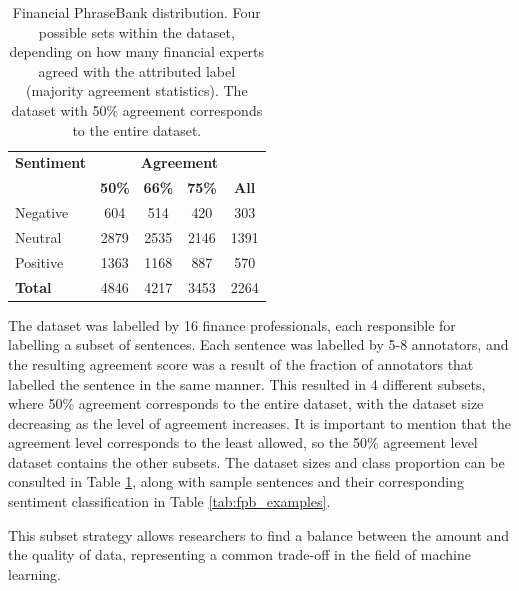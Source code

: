 \documentclass[conference]{IEEEtran}
\begin{document}
\begin{table}[H]
\centering
\caption{Financial PhraseBank distribution. Four possible sets within the dataset, depending on how many financial experts agreed with the attributed label (majority agreement statistics). The dataset with 50\% agreement corresponds to the entire dataset.}

\label{agreement_datasets}
\begin{tabular}{lcccc}
\toprule
\textbf{Sentiment} & \multicolumn{4}{c}{\textbf{Agreement}} \\
\cmidrule(lr){2-5}
 & \textbf{50\%} & \textbf{66\%} & \textbf{75\%} & \textbf{All} \\
\midrule
Negative & 604 & 514 & 420 & 303 \\
Neutral & 2879 & 2535 & 2146 & 1391 \\
Positive & 1363 & 1168 & 887 & 570 \\
\midrule
\textbf{Total} & 4846 & 4217 & 3453 & 2264 \\
\bottomrule
\end{tabular}
\end{table}

The dataset was labelled by 16 finance professionals, each responsible for labelling a subset of sentences. Each sentence was labelled by 5-8 annotators, and the resulting agreement score was a result of the fraction of annotators that labelled the sentence in the same manner. This resulted in 4 different subsets, where 50\% agreement corresponds to the entire dataset, with the dataset size decreasing as the level of agreement increases. It is important to mention that the agreement level corresponds to the least allowed, so the 50\% agreement level dataset contains the other subsets. The dataset sizes and class proportion can be consulted in Table \ref{agreement_datasets}, along with sample sentences and their corresponding sentiment classification in Table \ref{tab:fpb_examples}.

This subset strategy allows researchers to find a balance between the amount and the quality of data, representing a common trade-off in the field of machine learning.
\end{document}
